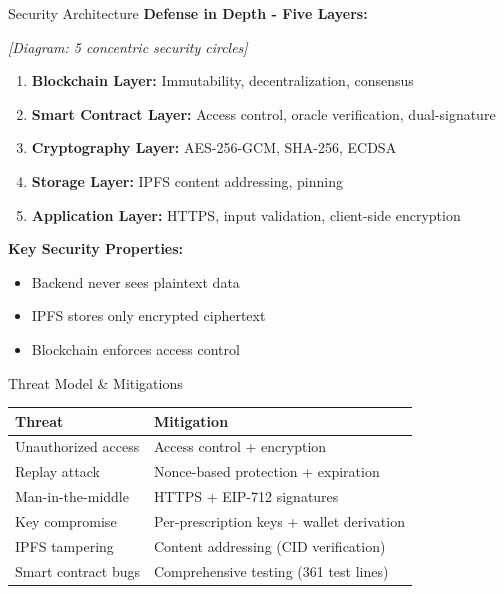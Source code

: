 \documentclass[10pt]{beamer}
\begin{document}
\begin{frame}{Security Architecture}
\textbf{Defense in Depth - Five Layers:}

\vspace{0.2cm}
\begin{center}
\textit{[Diagram: 5 concentric security circles]}
\end{center}

\vspace{0.2cm}
\begin{enumerate}
\item \textbf{Blockchain Layer:} Immutability, decentralization, consensus
\item \textbf{Smart Contract Layer:} Access control, oracle verification, dual-signature
\item \textbf{Cryptography Layer:} AES-256-GCM, SHA-256, ECDSA
\item \textbf{Storage Layer:} IPFS content addressing, pinning
\item \textbf{Application Layer:} HTTPS, input validation, client-side encryption
\end{enumerate}

\vspace{0.2cm}
\textbf{Key Security Properties:}
\begin{itemize}
\item Backend never sees plaintext data
\item IPFS stores only encrypted ciphertext
\item Blockchain enforces access control
\end{itemize}
\end{frame}

\begin{frame}{Threat Model \& Mitigations}
\small
\begin{table}[h]
\centering
\begin{tabular}{@{}p{3.5cm}p{6cm}@{}}
\toprule
\textbf{Threat} & \textbf{Mitigation} \\
\midrule
Unauthorized access & Access control + encryption \\
Replay attack & Nonce-based protection + expiration \\
Man-in-the-middle & HTTPS + EIP-712 signatures \\
Key compromise & Per-prescription keys + wallet derivation \\
IPFS tampering & Content addressing (CID verification) \\
Smart contract bugs & Comprehensive testing (361 test lines) \\
\bottomrule
\end{tabular}
\end{table}
\end{frame}
\end{document}
